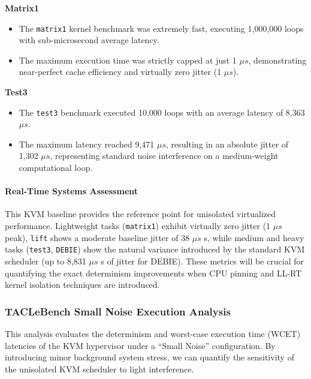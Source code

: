 \textbf{Matrix1}

\begin{itemize}
\item
  The \texttt{matrix1} kernel benchmark was extremely fast, executing
  1,000,000 loops with sub-microsecond average latency.
\item
  The maximum execution time was strictly capped at just 1 $\mu s$,
  demonstrating near-perfect cache efficiency and virtually zero jitter
  (1 $\mu s$).
\end{itemize}

\textbf{Test3}

\begin{itemize}
\item
  The \texttt{test3} benchmark executed 10,000 loops with an average
  latency of 8,363 $\mu s$.
\item
  The maximum latency reached 9,471 $\mu s$, resulting in an absolute jitter
  of 1,302 $\mu s$, representing standard noise interference on a
  medium-weight computational loop.
\end{itemize}

\paragraph{Real-Time Systems
Assessment}\label{real-time-systems-assessment}

This KVM baseline provides the reference point for unisolated
virtualized performance. Lightweight tasks (\texttt{matrix1}) exhibit
virtually zero jitter (1 $\mu s$ peak), \texttt{lift} shows a moderate
baseline jitter of 38 $\mu s$ s, while medium and heavy tasks (\texttt{test3},
\texttt{DEBIE}) show the natural variance introduced by the standard KVM
scheduler (up to 8,831 $\mu s$ s of jitter for DEBIE). These metrics will be
crucial for quantifying the exact determinism improvements when CPU
pinning and LL-RT kernel isolation techniques are introduced.

\subsubsection{TACLeBench Small Noise Execution
Analysis}\label{taclebench-small-noise-execution-analysis}

This analysis evaluates the determinism and worst-case execution time
(WCET) latencies of the KVM hypervisor under a ``Small Noise''
configuration. By introducing minor background system stress, we can
quantify the sensitivity of the unisolated KVM scheduler to light
interference.

